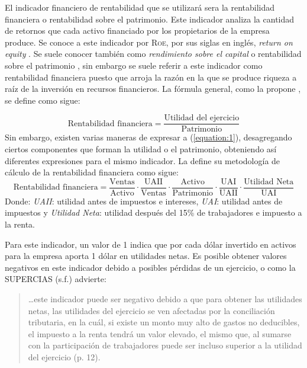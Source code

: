 \documentclass[12pt,a4paper,twoside]{article}
\begin{document}
El indicador financiero de rentabilidad que se utilizará sera la rentabilidad financiera o rentabilidad sobre el patrimonio. Este indicador analiza la cantidad de retornos que cada activo financiado por los propietarios de la empresa produce. Se conoce a este indicador por \textsc{Roe}, por sus siglas en inglés, \textit{return on equity} \parencite{rentabilidad:laolivares}. Se suele conocer también como \textit{rendimiento sobre el capital} o rentabilidad sobre el patrimonio \parencite{contahorngren}, sin embargo se suele referir a este indicador como rentabilidad financiera puesto que arroja la razón en la que se produce riqueza a raíz de la inversión en recursos financieros. La fórmula general, como la propone \textcite{rentabilidad:laolivares}, se define como sigue: \par
\begin{equation}\label{equation:1}
    \text{Rentabilidad financiera}=\frac{\text{Utilidad \ del ejercicio}}{\text{Patrimonio}}
\end{equation}
Sin embargo, existen varias maneras de expresar a (\ref{equation:1}), desagregando ciertos componentes que forman la utilidad o el patrimonio, obteniendo así diferentes expresiones para el mismo indicador. La \textcite{metodologiaindicadoresfinancierossuperintendenciadecompanias} define su metodología de cálculo de la rentabilidad financiera como sigue:
\begin{equation}\label{eq:1}
    \text{Rentabilidad financiera}= \frac{\text{Ventas}}{\text{Activo}} \cdot \frac{\text{UAII}}{\text{Ventas}} \cdot \frac{\text{Activo}}{\text{Patrimonio}} \cdot \frac{\text{UAI}}{\text{UAII}}\cdot \frac{\text{Utilidad Neta}}{\text{UAI}}
\end{equation}
Donde: \textit{UAII}: utilidad antes de impuestos e intereses, \textit{UAI}: utilidad antes de impuestos y \textit{Utilidad Neta}: utilidad después del 15\% de trabajadores e impuesto a la renta. 

Para este indicador, un valor de 1 indica que por cada dólar invertido en activos para la empresa aporta 1 dólar en utilidades netas. Es posible obtener valores negativos en este indicador debido a posibles pérdidas de un ejercicio, o como la SUPERCIAS (s.f.) advierte: \blockquote{\ldots este indicador puede ser negativo debido a que para obtener las utilidades netas, las utilidades del ejercicio se ven afectadas por la conciliación tributaria, en la cuál, si existe un monto muy alto de gastos no deducibles, el impuesto a la renta tendrá un valor elevado, el mismo que, al sumarse con la participación de trabajadores puede ser incluso superior a la utilidad del ejercicio (p. 12).} 
\end{document}

